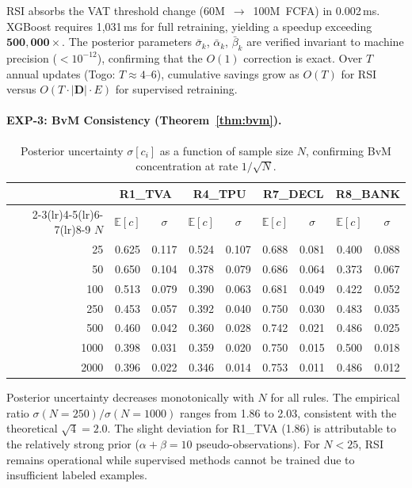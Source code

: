 \documentclass[letterpaper]{article}
\begin{document}
RSI absorbs the VAT threshold change (60M~$\to$~100M~FCFA) in
0.002\,ms. XGBoost requires 1{,}031\,ms for full retraining, yielding
a speedup exceeding $\mathbf{500{,}000\times}$. The posterior
parameters $\bar{\sigma}_k$, $\bar{\alpha}_k$, $\bar{\beta}_k$ are
verified invariant to machine precision ($<10^{-12}$), confirming that
the $O(1)$ correction is exact. Over $T$ annual updates (Togo:
$T \approx 4$--6), cumulative savings grow as $O(T)$ for RSI versus
$O(T \cdot |\mathbf{D}| \cdot E)$ for supervised retraining.

\paragraph{EXP-3: BvM Consistency (Theorem~\ref{thm:bvm}).}

\begin{table}[H]
\centering
\caption{Posterior uncertainty $\sigma[c_i]$ as a function of sample
         size $N$, confirming BvM concentration at rate $1/\sqrt{N}$.}
\label{tab:bvm}
\renewcommand{\arraystretch}{1.2}
\begin{tabular}{r cc cc cc cc}
\toprule
& \multicolumn{2}{c}{\textbf{R1\_TVA}}
& \multicolumn{2}{c}{\textbf{R4\_TPU}}
& \multicolumn{2}{c}{\textbf{R7\_DECL}}
& \multicolumn{2}{c}{\textbf{R8\_BANK}} \\
\cmidrule(lr){2-3}\cmidrule(lr){4-5}\cmidrule(lr){6-7}\cmidrule(lr){8-9}
$N$ & $\mathbb{E}[c]$ & $\sigma$
    & $\mathbb{E}[c]$ & $\sigma$
    & $\mathbb{E}[c]$ & $\sigma$
    & $\mathbb{E}[c]$ & $\sigma$ \\
\midrule
  25  & 0.625 & 0.117 & 0.524 & 0.107 & 0.688 & 0.081 & 0.400 & 0.088 \\
  50  & 0.650 & 0.104 & 0.378 & 0.079 & 0.686 & 0.064 & 0.373 & 0.067 \\
 100  & 0.513 & 0.079 & 0.390 & 0.063 & 0.681 & 0.049 & 0.422 & 0.052 \\
 250  & 0.453 & 0.057 & 0.392 & 0.040 & 0.750 & 0.030 & 0.483 & 0.035 \\
 500  & 0.460 & 0.042 & 0.360 & 0.028 & 0.742 & 0.021 & 0.486 & 0.025 \\
1000  & 0.398 & 0.031 & 0.359 & 0.020 & 0.750 & 0.015 & 0.500 & 0.018 \\
2000  & 0.396 & 0.022 & 0.346 & 0.014 & 0.753 & 0.011 & 0.486 & 0.012 \\
\bottomrule
\end{tabular}
\end{table}

Posterior uncertainty decreases monotonically with $N$ for all rules.
The empirical ratio $\sigma(N{=}250)/\sigma(N{=}1000)$ ranges from
1.86 to 2.03, consistent with the theoretical $\sqrt{4} = 2.0$. The
slight deviation for R1\_TVA (1.86) is attributable to the relatively
strong prior ($\alpha{+}\beta = 10$ pseudo-observations). For $N < 25$,
RSI remains operational while supervised methods cannot be trained due
to insufficient labeled examples.
\end{document}

